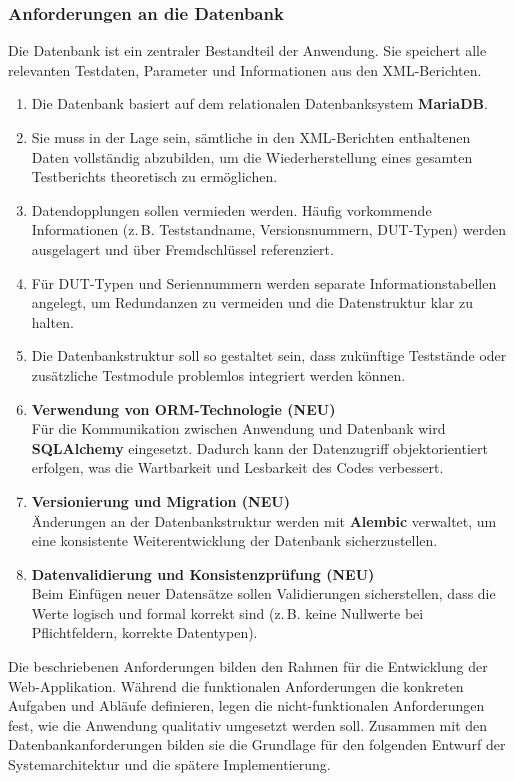 \subsubsection{Anforderungen an die Datenbank}
\label{subsec:anforderungen-an-die-datenbank}

Die Datenbank ist ein zentraler Bestandteil der Anwendung.
Sie speichert alle relevanten Testdaten, Parameter und Informationen aus den XML-Berichten.

\begin{enumerate}
  \item Die Datenbank basiert auf dem relationalen Datenbanksystem \textbf{MariaDB}.

  \item Sie muss in der Lage sein, sämtliche in den XML-Berichten enthaltenen Daten vollständig abzubilden,
  um die Wiederherstellung eines gesamten Testberichts theoretisch zu ermöglichen.

  \item Datendopplungen sollen vermieden werden.
  Häufig vorkommende Informationen (z.\,B. Teststandname, Versionsnummern, DUT-Typen) werden ausgelagert und über Fremdschlüssel referenziert.

  \item Für DUT-Typen und Seriennummern werden separate Informationstabellen angelegt,
  um Redundanzen zu vermeiden und die Datenstruktur klar zu halten.

  \item Die Datenbankstruktur soll so gestaltet sein, dass zukünftige Teststände oder zusätzliche Testmodule problemlos integriert werden können.

  \item \textbf{Verwendung von ORM-Technologie \textbf{(NEU)}} \\
  Für die Kommunikation zwischen Anwendung und Datenbank wird \textbf{SQLAlchemy} eingesetzt.
  Dadurch kann der Datenzugriff objektorientiert erfolgen, was die Wartbarkeit und Lesbarkeit des Codes verbessert.

  \item \textbf{Versionierung und Migration \textbf{(NEU)}} \\
  Änderungen an der Datenbankstruktur werden mit \textbf{Alembic} verwaltet,
  um eine konsistente Weiterentwicklung der Datenbank sicherzustellen.

  \item \textbf{Datenvalidierung und Konsistenzprüfung \textbf{(NEU)}} \\
  Beim Einfügen neuer Datensätze sollen Validierungen sicherstellen,
  dass die Werte logisch und formal korrekt sind (z.\,B. keine Nullwerte bei Pflichtfeldern, korrekte Datentypen).
\end{enumerate}

Die beschriebenen Anforderungen bilden den Rahmen für die Entwicklung der Web-Applikation.
Während die funktionalen Anforderungen die konkreten Aufgaben und Abläufe definieren,
legen die nicht-funktionalen Anforderungen fest, wie die Anwendung qualitativ umgesetzt werden soll.
Zusammen mit den Datenbankanforderungen bilden sie die Grundlage für den folgenden Entwurf der Systemarchitektur und die spätere Implementierung.

